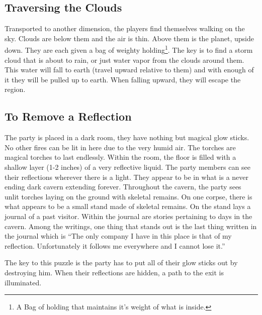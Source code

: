 \subsection{Traversing the Clouds}

Transported to another dimension, the players find themselves walking on the sky. Clouds are below them and the air is thin. Above them is the planet, upside down. They are each given a bag of weighty holding\footnote{A Bag of holding that maintains it's weight of what is inside.}. The key is to find a storm cloud that is about to rain, or just water vapor from the clouds around them. This water will fall to earth (travel upward relative to them) and with enough of it they will be pulled up to earth. When falling upward, they will escape the region. 

\subsection{To Remove a Reflection}

The party is placed in a dark room, they have nothing but magical glow sticks. No other fires can be lit in here due to the very humid air. The torches are magical torches to last endlessly. Within the room, the floor is filled with a shallow layer (1-2 inches) of a very reflective liquid. The party members can see their reflections wherever there is a light. They appear to be in what is a never ending dark cavern extending forever. Throughout the cavern, the party sees unlit torches laying on the ground with skeletal remains. On one corpse, there is what appears to be a small stand made of skeletal remains. On the stand lays a journal of a past visitor. Within the journal are stories pertaining to days in the cavern. Among the writings, one thing that stands out is the last thing written in the journal which is ``The only company I have in this place is that of my reflection. Unfortunately it follows me everywhere and I cannot lose it.''

The key to this puzzle is the party has to put all of their glow sticks out by destroying him. When their reflections are hidden, a path to the exit is illuminated.


